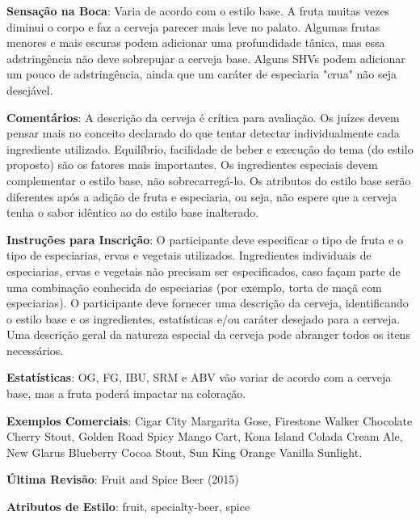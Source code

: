 \textbf{Sensação na Boca}: Varia de acordo com o estilo base. A fruta muitas vezes diminui o corpo e faz a cerveja parecer mais leve no palato. Algumas frutas menores e mais escuras podem adicionar uma profundidade tânica, mas essa adstringência não deve sobrepujar a cerveja base. Alguns SHVs podem adicionar um pouco de adstringência, ainda que um caráter de especiaria "crua" não seja desejável.

\textbf{Comentários}: A descrição da cerveja é crítica para avaliação. Os juízes devem pensar mais no conceito declarado do que tentar detectar individualmente cada ingrediente utilizado. Equilíbrio, facilidade de beber e execução do tema (do estilo proposto) são os fatores mais importantes. Os ingredientes especiais devem complementar o estilo base, não sobrecarregá-lo. Os atributos do estilo base serão diferentes após a adição de fruta e especiaria, ou seja, não espere que a cerveja tenha o sabor idêntico ao do estilo base inalterado.

\textbf{Instruções para Inscrição}: O participante deve especificar o tipo de fruta e o tipo de especiarias, ervas e vegetais utilizados. Ingredientes individuais de especiarias, ervas e vegetais não precisam ser especificados, caso façam parte de uma combinação conhecida de especiarias (por exemplo, torta de maçã com especiarias). O participante deve fornecer uma descrição da cerveja, identificando o estilo base e os ingredientes, estatísticas e/ou caráter desejado para a cerveja. Uma descrição geral da natureza especial da cerveja pode abranger todos os itens necessários.

\textbf{Estatísticas}: OG, FG, IBU, SRM e ABV vão variar de acordo com a cerveja base, mas a fruta poderá impactar na coloração.

\textbf{Exemplos Comerciais}: Cigar City Margarita Gose, Firestone Walker Chocolate Cherry Stout, Golden Road Spicy Mango Cart, Kona Island Colada Cream Ale, New Glarus Blueberry Cocoa Stout, Sun King Orange Vanilla Sunlight.

\textbf{Última Revisão}: Fruit and Spice Beer (2015)

\textbf{Atributos de Estilo}: fruit, specialty-beer, spice
